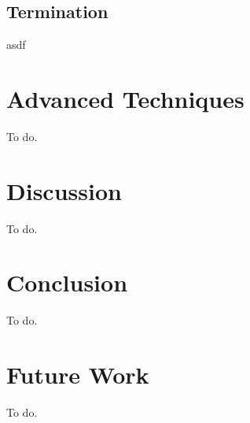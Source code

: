 \documentclass[sigconf]{acmart}
\begin{document}
\subsection{Termination}
asdf \cite{Beligiannis2009}


\section{Advanced Techniques}
To do.

\section{Discussion}
To do.

\section{Conclusion}
To do.

\section{Future Work}
To do.









\end{document}
